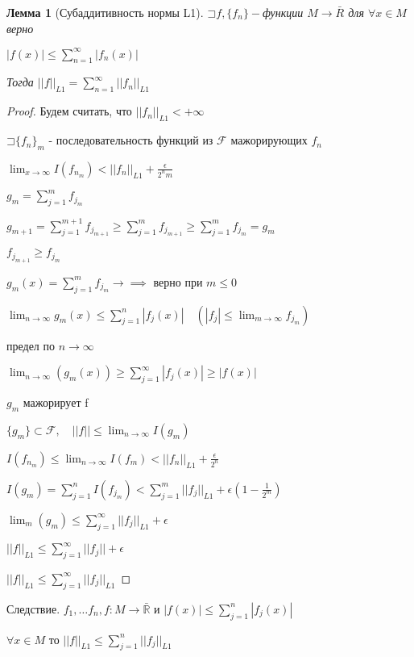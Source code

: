\documentclass[a4paper, 12pt]{article}
\newcommand\letsymbol{\mathord{\sqsupset}}
\newtheorem{lemma}{Лемма}[section]
\theoremstyle{definition}
\theoremstyle{remark}
\begin{document}
\begin{lemma}[Субаддитивность нормы L1]
     $\letsymbol{}f, \{f_n\} - $функции $M\to \bar{R}$
     для $\forall x\in M$ верно

     $|f(x)| \leq \sum_{n = 1}^{\infty} |f_n(x)| $

     Тогда $||f||_{L1} =\sum_{n = 1}^{\infty} ||f_n||_{L1} $
\end{lemma}
\begin{proof}
     Будем считать, что $||f_n||_{L1}< +\infty$

     $\letsymbol{}\{f_n\}_m$ - последовательность функций из $\mathcal{F} $ мажорирующих $f_n$

     $\lim_{x \to \infty} I(f_{n_m})< ||f_n||_{L1} + \frac{\epsilon}{2^n m}$

     $g_m = \sum_{j = 1}^{m}  f_{j_m}$

     $g_{m+1} = \sum_{j = 1}^{m+1} f_{j_{m+1}} \geq \sum_{j = 1}^{m} f_{j_{m+1}}\geq\sum_{j = 1}^{m}  f_{j_m} = g_m$

     $f_{j_{m+1}}\geq f_{j_m}$ 

     $g_m(x) = \sum_{j = 1}^{m} f_{j_m}\to\implies$ верно при $m\leq 0$

     $\lim_{n\to\infty} g_m(x)\leq \sum_{j = 1}^{n}  |f_j(x)| \quad (|f_j|\leq \lim_{m \to \infty} f_{j_m})$
     
     предел по $n\to\infty$

     $\lim_{n \to \infty}  (g_m(x))\geq \sum_{j = 1}^{\infty} |f_j(x)| \geq |f(x)|$

     $g_m$ мажорирует f

     $\{g_m\}\subset \mathcal{F}, \quad ||f||\leq \lim_{n \to \infty} I(g_m) $

     $I(f_{n_m})\leq \lim_{n \to \infty} I(f_m) < ||f_n||_{L1}+\frac{\epsilon}{2^n}$

     $I(g_m) = \sum_{j = 1}^{n}  I(f_{j_m})< \sum_{j = 1}^{m} ||f_j||_{L1} +\epsilon(1 - \frac{1}{2^m})$

     $\lim_m (g_m)\leq \sum_{j = 1}^{\infty} ||f_j||_{L1} +\epsilon$

     $||f||_{L1}\leq \sum_{j = 1}^{\infty} ||f_j||+\epsilon$

     $||f||_{L1}\leq \sum_{j = 1}^{\infty} ||f_j||_{L1}$
\end{proof}
Следствие. $f_1, \dots f_n, f : M\to \bar{\mathbb{R} }$ и $|f(x)|\leq \sum_{j = 1}^{n}  |f_j(x)|$

$\forall x \in M $ то $||f||_{L1}\leq \sum_{j = 1}^{n} ||f_j||_{L1} $
\end{document}
